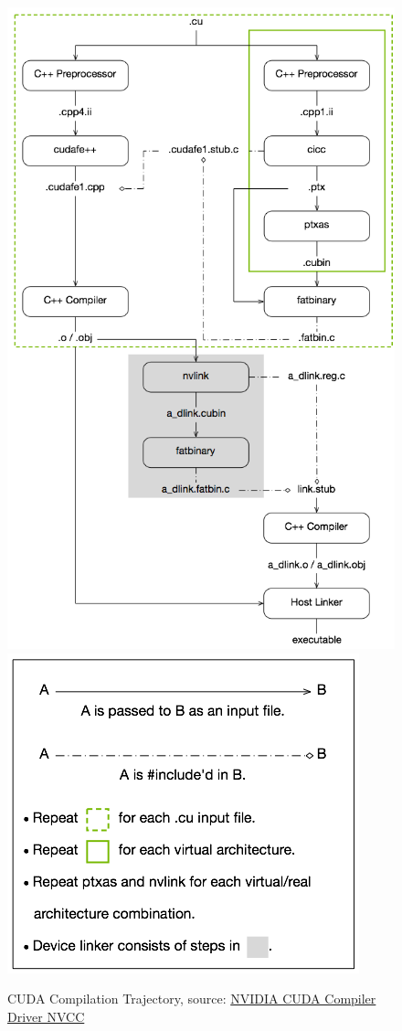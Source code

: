 \begin{figure}[!htp]
   \centering
   \includegraphics[width=.7\textwidth]{img/cuda-compilation-from-cu-to-executable-1.png}
   \includegraphics[width=.5\textwidth]{img/cuda-compilation-from-cu-to-executable-2.png}
   \caption{CUDA Compilation Trajectory, source: \href{https://docs.nvidia.com/cuda/cuda-compiler-driver-nvcc/index.html}{NVIDIA CUDA Compiler Driver NVCC}}
\end{figure}
